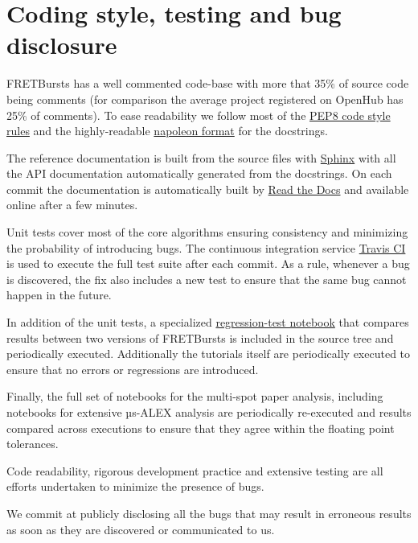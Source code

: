 \section{Coding style, testing and bug disclosure}

FRETBursts has a well commented code-base with more that 35\% of source code
being comments (for comparison the average project registered on OpenHub has 25\%
of comments). To ease readability we follow most of the 
\href{https://www.python.org/dev/peps/pep-0008/}{PEP8 code style rules} and 
the highly-readable \href{http://sphinxcontrib-napoleon.readthedocs.org/}{napoleon format}
for the docstrings.

The reference documentation is built from the source files with \href{http://sphinx-doc.org/}{Sphinx} with
all the API documentation automatically generated from the docstrings.
On each commit the documentation is automatically built by 
\href{https://readthedocs.org/}{Read the Docs}
and available online after a few minutes.

Unit tests cover most of the core algorithms ensuring consistency and 
minimizing the probability of introducing bugs. The continuous integration
service \href{http://travis-ci.org}{Travis CI} is used to execute the full
test suite after each commit.
As a rule, whenever a bug is discovered, the  fix also includes a new test 
to ensure that the same bug cannot happen in the future.

In addition of the unit tests, a specialized 
\href{https://github.com/tritemio/FRETBursts/blob/master/notebooks/dev/tests/FRETBursts\%20-\%20Regression\%20tests.ipynb}{regression-test notebook}
that compares results between two versions of FRETBursts is
included in the source tree and periodically executed. Additionally
the tutorials itself are periodically executed to ensure that
no errors or regressions are introduced.

Finally, the full set of notebooks for the multi-spot paper analysis,
including notebooks for extensive µs-ALEX analysis are periodically
re-executed and results compared across executions to ensure that 
they agree within the floating point tolerances.

Code readability, rigorous development practice and extensive testing
are all efforts undertaken to minimize the presence of bugs.

We commit at publicly disclosing all the bugs that may result in erroneous results 
as soon as they are discovered or communicated to us.
